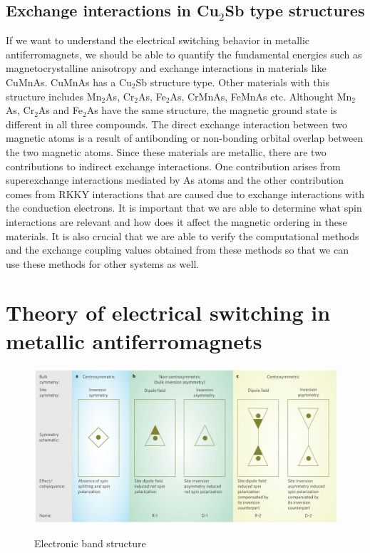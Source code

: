 \documentclass[11pt,edeposit,draftthesis]{uiucthesis2020}
\begin{document}
\begin{mainmatter}
\section{Exchange interactions in Cu$_2$Sb type structures}
If we want to understand the electrical switching behavior in metallic antiferromagnets, we should be able to quantify the fundamental energies such as magnetocrystalline anisotropy and exchange interactions in materials like CuMnAs. CuMnAs has a Cu$_2$Sb structure type. Other materials with this structure includes Mn$_2$As, Cr$_2$As, Fe$_2$As, CrMnAs, FeMnAs etc. Althought Mn$_2$As, Cr$_2$As and Fe$_2$As have the same structure, the magnetic ground state is different in all three compounds. The direct exchange interaction between two magnetic atoms is a result of antibonding or non-bonding orbital overlap between the two magnetic atoms. Since these materials are metallic, there are two contributions to indirect exchange interactions. One contribution arises from superexchange interactions mediated by As atoms and the other contribution comes from RKKY interactions that are caused due to exchange interactions with the conduction electrons. It is important that we are able to determine what spin interactions are relevant and how does it affect the magnetic ordering in these materials. It is also crucial that we are able to verify the computational methods and the exchange coupling values obtained from these methods so that we can use these methods for other systems as well.

\chapter{Theory of electrical switching in metallic antiferromagnets}

\begin{figure}
\centering\includegraphics[width=\columnwidth]{figures/ch2/zhang_1.png} \\
\caption{\label{fig:zhang_1}
Electronic band structure
}
\end{figure}


\end{mainmatter}
\end{document}
